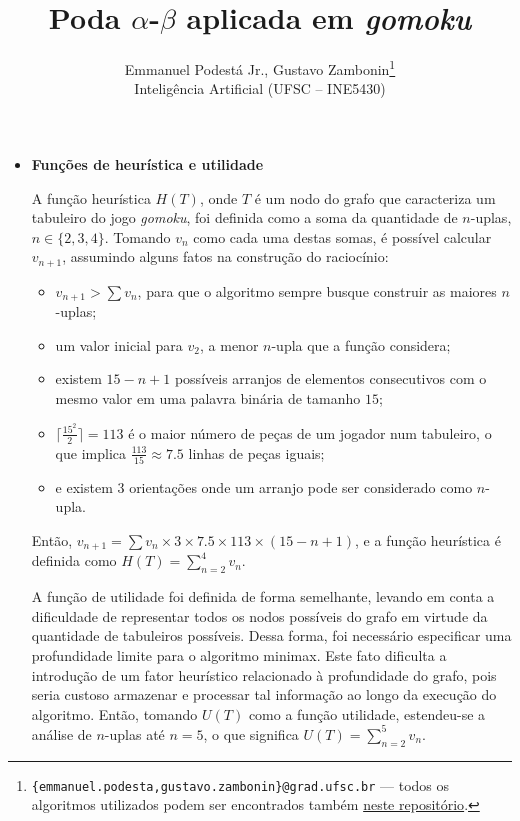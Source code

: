 \documentclass{article}
\title{\textbf{Poda $\alpha$-$\beta$ aplicada em \textit{gomoku}}}
\author{Emmanuel Podestá Jr., Gustavo Zambonin\thanks{
    \texttt{\{emmanuel.podesta,gustavo.zambonin\}@grad.ufsc.br} --- todos os
    algoritmos utilizados podem ser encontrados também
    \href{https://github.com/zambonin/ufsc-ine5430}{neste repositório}.} \\
\small {Inteligência Artificial (UFSC -- INE5430)} \vspace{-5mm}}
\date{}
\begin{document}
\maketitle

\begin{itemize}

    \item \textbf{Funções de heurística e utilidade}

        A função heurística $H(T)$, onde $T$ é um nodo do grafo que
        caracteriza um tabuleiro do jogo \textit{gomoku}, foi definida como
        a soma da quantidade de $n$-uplas, $n \in \{2, 3, 4\}$. Tomando $v_n$
        como cada uma destas somas, é possível calcular $v_{n + 1}$,
        assumindo alguns fatos na construção do raciocínio: 
        
        \begin{itemize}
        
            \item $v_{n + 1} > \sum v_n$, para que o algoritmo sempre busque
                construir as maiores $n$-uplas;
                
            \item um valor inicial para $v_2$, a menor $n$-upla que a função
                considera; 
                
            \item existem $15 - n + 1$ possíveis arranjos de elementos
                consecutivos com o mesmo valor em uma palavra binária de
                tamanho $15$; 
                
            \item $\lceil \frac{15^2}{2} \rceil = 113$ é o maior número
                de peças de um jogador num tabuleiro, o que implica 
                $\frac{113}{15} \approx 7.5$ linhas de peças iguais;
                
            \item e existem 3 orientações onde um arranjo pode ser considerado
                como $n$-upla.

        \end{itemize}

        Então, $v_{n+1} = \sum v_n \times 3 \times 7.5 \times 113 \times
        (15 - n + 1)$, e a função heurística é definida como
        $H(T) = \sum_{n=2}^4 v_n$.

        A função de utilidade foi definida de forma semelhante, levando em
        conta a dificuldade de representar todos os nodos possíveis do grafo
        em virtude da quantidade de tabuleiros possíveis. Dessa forma, foi
        necessário especificar uma profundidade limite para o algoritmo
        minimax. Este fato dificulta a introdução de um fator heurístico
        relacionado à profundidade do grafo, pois seria custoso armazenar
        e processar tal informação ao longo da execução do algoritmo. Então,
        tomando $U(T)$ como a função utilidade, estendeu-se a análise de
        $n$-uplas até $n = 5$, o que significa $U(T) = \sum_{n=2}^5 v_n$.


\end{itemize}
\end{document}
